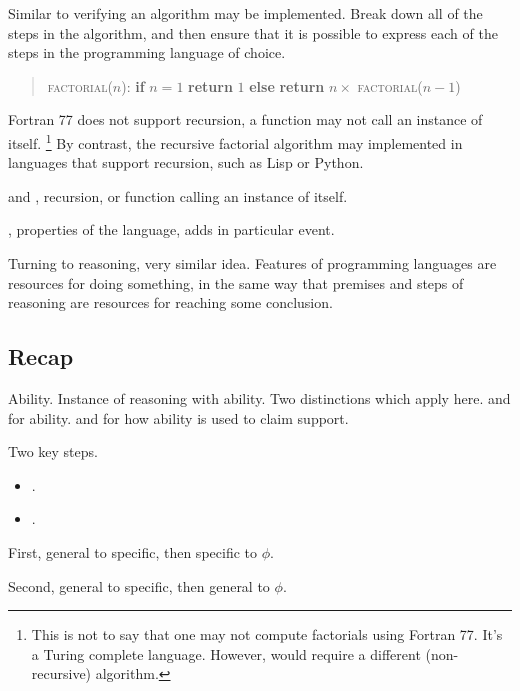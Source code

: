 \begin{note}
  Similar to verifying an algorithm may be implemented.
  Break down all of the steps in the algorithm, and then ensure that it is possible to express each of the steps in the programming language of choice.

  \begin{quote}
    \textsc{factorial}(\(n\)):\newline
    \textbf{if} \(n = 1\)\newline
    \mbox{}\indent \textbf{return} \(1\)\newline
    \textbf{else}\newline
    \mbox{}\indent \textbf{return} \(n \times\) \textsc{factorial}(\(n-1\))
  \end{quote}

  Fortran 77 does not support recursion, a function may not call an instance of itself.\nolinebreak
  \footnote{
    This is not to say that one may not compute factorials using Fortran 77.
    It's a Turing complete language.
    However, would require a different (non-recursive) algorithm.
  }
  By contrast, the recursive factorial algorithm may implemented in languages that support recursion, such as Lisp or Python.

  \adA{} and \adB{}, recursion, or function calling an instance of itself.

  \AR{}, properties of the language, \WR{} adds in particular event.
\end{note}

\begin{note}
  Turning to reasoning, very similar idea.
  Features of programming languages are resources for doing something, in the same way that premises and steps of reasoning are resources for reaching some conclusion.
\end{note}

\subsection{Recap}
\label{sec:recap-reasoning}

\begin{note}
  Ability.
  Instance of reasoning with ability.
  Two distinctions which apply here.
  \AR{} and \WR{} for ability.
  \adB{} and \adA{} for how ability is used to claim support.
\end{note}

\begin{note}
  Two key steps.
  \begin{itemize}
  \item \gsi{}.
  \item {}.
  \end{itemize}

  First, general to specific, then specific to \(\phi\).

  Second, general to specific, then general to \(\phi\).
\end{note}

